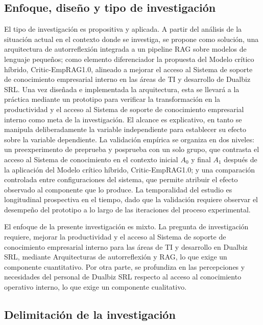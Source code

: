 \subsection{Enfoque, diseño y tipo de investigación}\label{sec:enfoque-diseno-tipo}

El tipo de investigación es propositiva y aplicada. A partir del análisis de la situación actual en el contexto donde se investiga, se propone como solución, una arquitectura de autorreflexión integrada a un pipeline RAG sobre modelos de lenguaje pequeños; como elemento diferenciador la propuesta del Modelo crítico híbrido, Critic-EmpRAG1.0, alineado a mejorar el acceso al Sistema de soporte de conocimiento empresarial interno en las áreas de TI y desarrollo de Dualbiz SRL. Una vez diseñada e implementada la arquitectura, esta se llevará a la práctica mediante un prototipo para verificar la transformación en la productividad y el acceso al Sistema de soporte de conocimiento empresarial interno como meta de la investigación. El alcance es explicativo, en tanto se manipula deliberadamente la variable independiente para establecer su efecto sobre la variable dependiente. La validación empírica se organiza en dos niveles: un preexperimento de preprueba y posprueba con un solo grupo, que contrasta el acceso al Sistema de conocimiento en el contexto inicial $A_0$ y final $A_1$ después de la aplicación del Modelo crítico híbrido, Critic-EmpRAG1.0; y una comparación controlada entre configuraciones del sistema, que permite atribuir el efecto observado al componente que lo produce. La temporalidad del estudio es longitudinal prospectiva en el tiempo, dado que la validación requiere observar el desempeño del prototipo a lo largo de las iteraciones del proceso experimental.

El enfoque de la presente investigación es mixto. La pregunta de investigación requiere, mejorar la productividad y el acceso al Sistema de soporte de conocimiento empresarial interno para las áreas de TI y desarrollo en Dualbiz SRL, mediante Arquitecturas de autorreflexión y RAG, lo que exige un componente cuantitativo. Por otra parte, se profundiza en las percepciones y necesidades del personal de Dualbiz SRL respecto al acceso al conocimiento operativo interno, lo que exige un componente cualitativo.

\subsection{Delimitación de la investigación}

